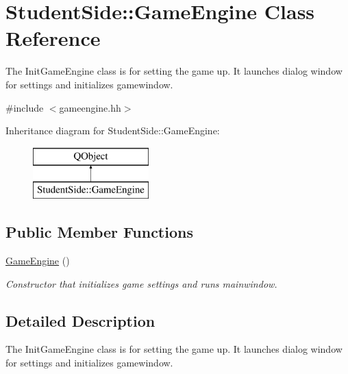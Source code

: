 \hypertarget{class_student_side_1_1_game_engine}{\section{Student\-Side\-:\-:Game\-Engine Class Reference}
\label{class_student_side_1_1_game_engine}
}


The Init\-Game\-Engine class is for setting the game up. It launches dialog window for settings and initializes gamewindow.  




{\ttfamily \#include $<$gameengine.\-hh$>$}

Inheritance diagram for Student\-Side\-:\-:Game\-Engine\-:\begin{figure}[H]
\begin{center}
\leavevmode
\includegraphics[height=2.000000cm]{class_student_side_1_1_game_engine}
\end{center}
\end{figure}
\subsection*{Public Member Functions}
\begin{DoxyCompactItemize}
\item 
\hyperlink{class_student_side_1_1_game_engine_a97ed7a110060bf799d7cc72f1444f160}{Game\-Engine} ()
\begin{DoxyCompactList}\small\item\em Constructor that initializes game settings and runs mainwindow. \end{DoxyCompactList}\end{DoxyCompactItemize}


\subsection{Detailed Description}
The Init\-Game\-Engine class is for setting the game up. It launches dialog window for settings and initializes gamewindow. 

